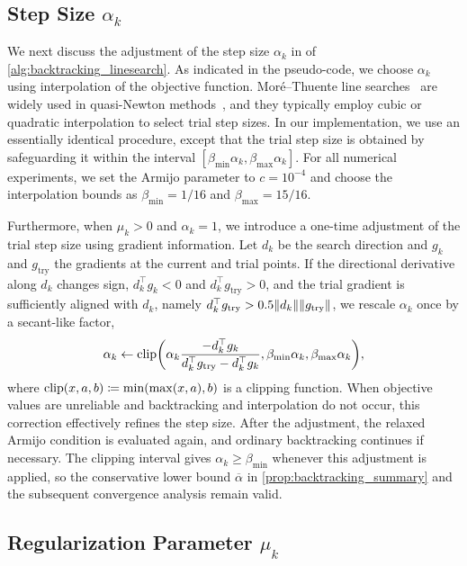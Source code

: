 \documentclass[journal_revised_MPC]{subfiles}
\begin{document}
\subsection{Step Size \texorpdfstring{$\alpha_k$}{alpha k}}\label{sec:proposed_choice_alpha}

We next discuss the adjustment of the step size $\alpha_k$ in  of \cref{alg:backtracking_linesearch}.
As indicated in the pseudo-code, we choose $\alpha_k$ using interpolation of the objective function.
Mor\'e--Thuente line searches~\citep{10.1145/192115.192132} are widely used in quasi-Newton methods~\citep{2020SciPy-NMeth}, and they typically employ cubic or quadratic interpolation to select trial step sizes.
In our implementation, we use an essentially identical procedure, except that the trial step size is obtained by safeguarding it within the interval $[\beta_{\min}\alpha_k, \beta_{\max}\alpha_k]$.
For all numerical experiments, we set the Armijo parameter to $c = 10^{-4}$ and choose the interpolation bounds as $\beta_{\min} = 1/16$ and $\beta_{\max} = 15/16$.

Furthermore, when $\mu_k>0$ and $\alpha_k=1$, we introduce a one-time adjustment of the trial step size using gradient information.
Let $d_k$ be the search direction and $g_k$ and $g_{\mathrm{try}}$ the gradients at the current and trial points.
If the directional derivative along $d_k$ changes sign, $d_k^\top g_k<0$ and $d_k^\top g_{\mathrm{try}}>0$, and the trial gradient is sufficiently aligned with $d_k$, namely $d_k^\top g_{\mathrm{try}}>0.5\norm{d_k}\norm{g_{\mathrm{try}}}$, we rescale $\alpha_k$ once by a secant-like factor,
\begin{equation*}
    \alpha_k \gets \mathrm{clip}\qty(\alpha_k \frac{-d_k^\top g_k}{d_k^\top g_{\mathrm{try}}-d_k^\top g_k},\beta_{\min}\alpha_k,\beta_{\max}\alpha_k),
\end{equation*}
where $\mathrm{clip}(x,a,b) \coloneqq \min(\max(x,a),b)$ is a clipping function.
When objective values are unreliable and backtracking and interpolation do not occur, this correction effectively refines the step size.
After the adjustment, the relaxed Armijo condition is evaluated again, and ordinary backtracking continues if necessary.
The clipping interval gives $\alpha_k\geq\beta_{\min}$ whenever this adjustment is applied, so the conservative lower bound $\overline\alpha$ in \cref{prop:backtracking_summary} and the subsequent convergence analysis remain valid.

\subsection{Regularization Parameter \texorpdfstring{$\mu_k$}{mu k}}\label{sec:proposed_choice_mu}
\end{document}
